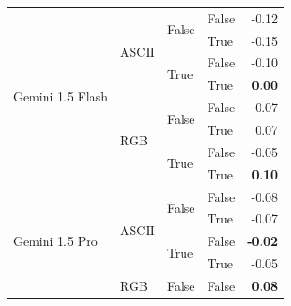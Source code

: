 \documentclass{article}
\begin{document}
\begin{table}
\begin{center}
{\begin{tabular}{@{}llllr@{}}
    \midrule
    \multirow[c]{8}{*}{Gemini 1.5 Flash}                                & \multirow[c]{4}{*}{ASCII} & \multirow[c]{2}{*}{False} & False                     & -0.12 \\
                                                                        &                           &                           & True                      & -0.15 \\
                                                                        &                           & \multirow[c]{2}{*}{True}  & False                     & -0.10 \\
                                                                        &                           &                           & True                      & \textbf{0.00} \\
    \cmidrule{2-5}
                                                                        & \multirow[c]{4}{*}{RGB}   & \multirow[c]{2}{*}{False} & False                     & 0.07 \\
                                                                        &                           &                           & True                      & 0.07 \\
                                                                        &                           & \multirow[c]{2}{*}{True}  & False                     & -0.05 \\
                                                                        &                           &                           & True                      & \textbf{0.10} \\
    \midrule
    \multirow[c]{8}{*}{Gemini 1.5 Pro}                                  & \multirow[c]{4}{*}{ASCII} & \multirow[c]{2}{*}{False} & False                     & -0.08 \\
                                                                        &                           &                           & True                      & -0.07 \\
                                                                        &                           & \multirow[c]{2}{*}{True}  & False                     & \textbf{-0.02} \\
                                                                        &                           &                           & True                      & -0.05 \\
    \cmidrule{2-5}
                                                                        & \multirow[c]{4}{*}{RGB}   & \multirow[c]{2}{*}{False} & False                     & \textbf{0.08} \\

\end{tabular}}
\end{center}
\end{table}
\end{document}
